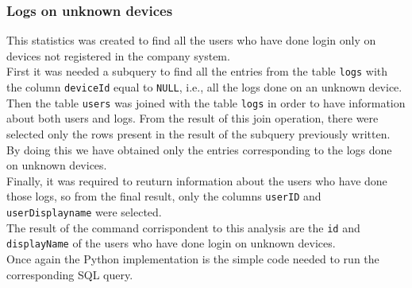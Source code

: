 \documentclass[12pt, a4paper, oneside]{article}
\begin{document}
\subsubsection{Logs on unknown devices}
This statistics was created to find all the users who have done login only on devices not registered in the company system.\\
First it was needed a subquery to find all the entries from the table \texttt{logs} with the column \texttt{deviceId} equal to \texttt{NULL}, i.e., all the logs done on an unknown device.\\
Then the table \texttt{users} was joined with the table \texttt{logs} in order to have information about both users and logs. From the result of this join operation, there were selected only the rows present
in the result of the subquery previously written. By doing this we have obtained only the entries corresponding to the logs done on unknown devices.\\
Finally, it was required to reuturn information about the users who have done those logs, so from the final result, only the columns \texttt{userID} and \texttt{userDisplayname} were selected.\\
The result of the command corrispondent to this analysis are the \texttt{id} and \texttt{displayName} of the users who have done login on unknown devices.\\
Once again the Python implementation is the simple code needed to run the corresponding SQL query.
\end{document}
